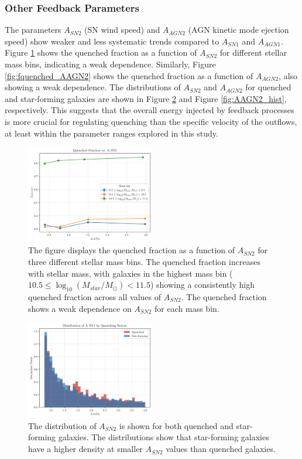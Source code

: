 \documentclass[twocolumn]{aastex631}
\begin{document}
\subsubsection{Other Feedback Parameters}

The parameters \(A_{SN2}\) (SN wind speed) and \(A_{AGN2}\) (AGN kinetic mode ejection speed) show weaker and less systematic trends compared to \(A_{SN1}\) and \(A_{AGN1}\). Figure \ref{fig:fquenched_ASN2} shows the quenched fraction as a function of $A_{SN2}$ for different stellar mass bins, indicating a weak dependence. Similarly, Figure \ref{fig:fquenched_AAGN2} shows the quenched fraction as a function of $A_{AGN2}$, also showing a weak dependence. The distributions of $A_{SN2}$ and $A_{AGN2}$ for quenched and star-forming galaxies are shown in Figure \ref{fig:ASN2_hist} and Figure \ref{fig:AAGN2_hist}, respectively. This suggests that the overall energy injected by feedback processes is more crucial for regulating quenching than the specific velocity of the outflows, at least within the parameter ranges explored in this study.

\begin{figure}[h!]
    \centering
    \includegraphics[width=0.5\textwidth]{../Project6/plots/fquenched_vs_A_SN2_20250424_133824.png}
    \caption{\label{fig:fquenched_ASN2} The figure displays the quenched fraction as a function of $A_{SN2}$ for three different stellar mass bins. The quenched fraction increases with stellar mass, with galaxies in the highest mass bin ($10.5 \leq \log_{10}(M_{star}/M_{\odot}) < 11.5$) showing a consistently high quenched fraction across all values of $A_{SN2}$. The quenched fraction shows a weak dependence on $A_{SN2}$ for each mass bin.
}
\end{figure}

\begin{figure}[h!]
    \centering
    \includegraphics[width=0.5\textwidth]{../Project6/plots/A_SN2_histogram_4_20250424_133143.png}
    \caption{\label{fig:ASN2_hist} The distribution of $A_{SN2}$ is shown for both quenched and star-forming galaxies. The distributions show that star-forming galaxies have a higher density at smaller $A_{SN2}$ values than quenched galaxies.
}
\end{figure}
\end{document}
